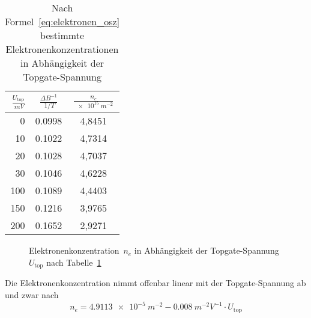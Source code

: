 \documentclass[a4paper]{article}
\begin{document}
\begin{table}[h!]
\begin{center}
\begin{tabular}{rcc}
\toprule
$\frac{U_{\text{top}}}{\SI{}{mV}}$ &
$\frac{\Delta B^{-1}}{\SI{}{1/T}}$ &
$\frac{n_e}{\SI{e15}{m^{-2}}}$ \\
\midrule
0   & \num{0.0998} & 4,8451 \\
10  & \num{0.1022} & 4,7314 \\
20  & \num{0.1028} & 4,7037 \\
30  & \num{0.1046} & 4,6228 \\
100 & \num{0.1089} & 4,4403 \\
150 & \num{0.1216} & 3,9765 \\
200 & \num{0.1652} & 2,9271 \\
\bottomrule
\end{tabular}
\end{center}
\caption{
	Nach Formel~\eqref{eq:elektronen_osz} bestimmte Elektronenkonzentrationen 
	in Abhängigkeit der Topgate-Spannung}
\label{tbl:ele_konz_topgate}
\end{table}

\begin{figure}[h!]
  \begin{center}
    
  \end{center}
  \caption{
	Elektronenkonzentration~$n_e$ in Abhängigkeit der
	Topgate-Spannung~$U_\text{top}$ nach Tabelle~\ref{tbl:ele_konz_topgate}}
  \label{fig:ele_konz_topgate}
\end{figure}


Die Elektronenkonzentration nimmt offenbar linear mit der Topgate-Spannung
ab und zwar nach
\begin{equation*}
	n_e = \SI{4.9113e-5}{m^{-2}} - \SI{0.008}{m^{-2}V^{-1}} \cdot U_\text{top}
\end{equation*}




\newpage
{}
\end{document}
